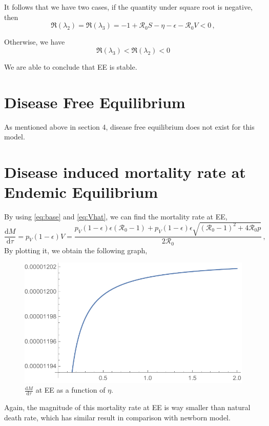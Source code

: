 \documentclass[12pt]{article}
\newcommand\dbyd[2]{\frac{\mathrm d{#1}}{\mathrm d{#2}}}
\newcommand{\R}{\mathcal{R}}
\newcommand{\pmV}{p_{V}}
\begin{document}
It follows that we have two cases, if the quantity under square root is negative, then
\begin{equation}
\Re(\lambda_2)=\Re(\lambda_3)=-1+\R_0 S-\eta-\epsilon-\R_0 V<0\,,
\end{equation}

Otherwise, we have
\begin{equation}
\Re(\lambda_3)<\Re(\lambda_2)<0
\end{equation}

We are able to conclude that EE is stable.

\section{Disease Free Equilibrium}
As mentioned above in section 4, disease free equilibrium does not exist for this model.

\section{Disease induced mortality rate at Endemic Equilibrium}

By using \autoref{eq:base} and \autoref{eq:Vhat}, we can find the mortality rate at EE,
\begin{equation}
\dbyd{M}{\tau}=\pmV(1-\epsilon)V=\frac{\pmV(1-\epsilon)\epsilon(\R_0 -1)+ \pmV(1-\epsilon)\epsilon \sqrt{(\R_0-1)^2+4\R_0 p}}{2\R_0}\,, \label{eq:dMdt}
\end{equation}
By plotting it, we obtain the following graph,
\begin{figure}[H]
  \centering
  \includegraphics[width=1\textwidth]{Figures/M_at_EE.pdf}
  \caption{$\dbyd{M}{\tau}$ at EE as a function of $\eta$.}
\end{figure}

Again, the magnitude of this mortality rate at EE is way smaller than natural death rate, which has similar result in comparison with newborn model.
\end{document}

